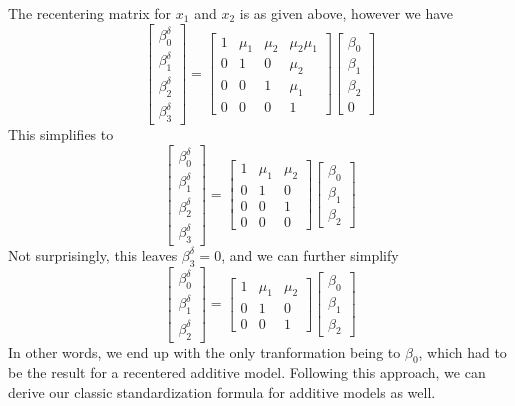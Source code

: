 \documentclass[]{article}
\begin{document}
The recentering matrix for \(x_1\) and \(x_2\) is as given above,
however we have
\[\begin{bmatrix}\beta_0^\delta \\ \beta_1^\delta \\ \beta_2^\delta \\ \beta_3^\delta \end{bmatrix}=
\begin{bmatrix} 1 & \mu_1 &\mu_2 &\mu_2\mu_1 \\
  0 &1 &0 &\mu_2 \\ 0 &0 &1 &\mu_1 \\ 0 &0 &0 &1 \end{bmatrix}
\begin{bmatrix}\beta_0 \\ \beta_1 \\ \beta_2 \\ 0 \end{bmatrix}\] This
simplifies to
\[\begin{bmatrix}\beta_0^\delta \\ \beta_1^\delta \\ \beta_2^\delta  \\ \beta_3^\delta \end{bmatrix}=
\begin{bmatrix} 1 & \mu_1 &\mu_2 \\
  0 &1 &0 \\ 0 &0 &1 \\ 0 &0 &0 \end{bmatrix}
\begin{bmatrix}\beta_0 \\ \beta_1 \\ \beta_2 \end{bmatrix}\] Not
surprisingly, this leaves \(\beta_3^\delta=0\), and we can further
simplify
\[\begin{bmatrix}\beta_0^\delta \\ \beta_1^\delta \\ \beta_2^\delta \end{bmatrix}=
\begin{bmatrix} 1 & \mu_1 &\mu_2 \\
  0 &1 &0 \\ 0 &0 &1 \end{bmatrix}
\begin{bmatrix}\beta_0 \\ \beta_1 \\ \beta_2 \end{bmatrix}\] In other
words, we end up with the only tranformation being to \(\beta_0\), which
had to be the result for a recentered additive model. Following this
approach, we can derive our classic standardization formula for additive
models as well.
\end{document}
